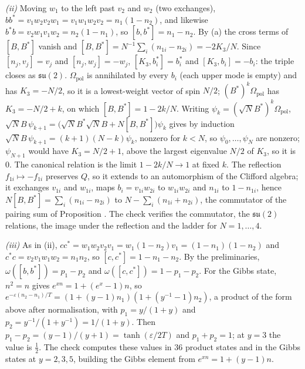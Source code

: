 \emph{(ii)} Moving $w_{1}$ to the left past $v_{2}$ and $w_{2}$ (two exchanges), $bb^{*} = v_{1}w_{2}v_{2}w_{1} = v_{1}w_{1}w_{2}v_{2} = n_{1}(1 - n_{2})$, and likewise $b^{*}b = v_{2}w_{1}v_{1}w_{2} = n_{2}(1 - n_{1})$, so $[b, b^{*}] = n_{1} - n_{2}$. By (a) the cross terms of $[B, B^{*}]$ vanish and $[B, B^{*}] = N^{-1}\sum_{i}(n_{1i} - n_{2i}) = -2K_{3}/N$. Since $[n_{j}, v_{j}] = v_{j}$ and $[n_{j}, w_{j}] = -w_{j}$, $[K_{3}, b_{i}^{*}] = b_{i}^{*}$ and $[K_{3}, b_{i}] = -b_{i}$: the triple closes as $\mathfrak{su}(2)$. $\Omega_{\mathrm{pol}}$ is annihilated by every $b_{i}$ (each upper mode is empty) and has $K_{3} = -N/2$, so it is a lowest-weight vector of spin $N/2$; $(B^{*})^{k}\Omega_{\mathrm{pol}}$ has $K_{3} = -N/2 + k$, on which $[B, B^{*}] = 1 - 2k/N$. Writing $\psi_{k} = (\sqrt{N}B^{*})^{k}\Omega_{\mathrm{pol}}$, $\sqrt{N}B\,\psi_{k+1} = \big(\sqrt{N}B^{*}\sqrt{N}B + N[B, B^{*}]\big)\psi_{k}$ gives by induction $\sqrt{N}B\,\psi_{k+1} = (k + 1)(N - k)\psi_{k}$, nonzero for $k < N$, so $\psi_{0}, \dots, \psi_{N}$ are nonzero; $\psi_{N+1}$ would have $K_{3} = N/2 + 1$, above the largest eigenvalue $N/2$ of $K_{3}$, so it is $0$. The canonical relation is the limit $1 - 2k/N \to 1$ at fixed $k$. The reflection $f_{1i} \mapsto -f_{1i}$ preserves $Q$, so it extends to an automorphism of the Clifford algebra; it exchanges $v_{1i}$ and $w_{1i}$, maps $b_{i} = v_{1i}w_{2i}$ to $w_{1i}w_{2i}$ and $n_{1i}$ to $1 - n_{1i}$, hence $N[B, B^{*}] = \sum_{i}(n_{1i} - n_{2i})$ to $N - \sum_{i}(n_{1i} + n_{2i})$, the commutator of the pairing sum of Proposition . The check verifies the commutator, the $\mathfrak{su}(2)$ relations, the image under the reflection and the ladder for $N = 1, \dots, 4$.

\emph{(iii)} As in (ii), $cc^{*} = w_{1}w_{2}v_{2}v_{1} = w_{1}(1 - n_{2})v_{1} = (1 - n_{1})(1 - n_{2})$ and $c^{*}c = v_{2}v_{1}w_{1}w_{2} = n_{1}n_{2}$, so $[c, c^{*}] = 1 - n_{1} - n_{2}$. By the preliminaries, $\omega([b, b^{*}]) = p_{1} - p_{2}$ and $\omega([c, c^{*}]) = 1 - p_{1} - p_{2}$. For the Gibbs state, $n^{2} = n$ gives $e^{xn} = 1 + (e^{x} - 1)n$, so $e^{-\varepsilon(n_{2} - n_{1})/T} = (1 + (y - 1)n_{1})(1 + (y^{-1} - 1)n_{2})$, a product of the form above after normalisation, with $p_{1} = y/(1 + y)$ and $p_{2} = y^{-1}/(1 + y^{-1}) = 1/(1 + y)$. Then $p_{1} - p_{2} = (y - 1)/(y + 1) = \tanh(\varepsilon/2T)$ and $p_{1} + p_{2} = 1$; at $y = 3$ the value is $\tfrac12$. The check computes these values in $36$ product states and in the Gibbs states at $y = 2, 3, 5$, building the Gibbs element from $e^{xn} = 1 + (y - 1)n$.

